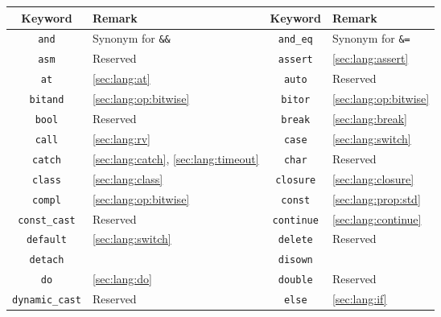 \ifx\ifHtml\undefined
\begin{tabular}{|c|l||c|l|}
  \hline
  Keyword & Remark & Keyword & Remark \\
  \hline
     \lstinline"and" & Synonym for \lstinline|&&|               &
  \lstinline"and_eq" & Synonym for \lstinline|&=|               \\
     \lstinline"asm" & Reserved                                 &
  \lstinline"assert" & \autoref{sec:lang:assert}                \\
      \lstinline"at" & \autoref{sec:lang:at}                    &
    \lstinline"auto" & Reserved                                 \\
  \lstinline"bitand" & \autoref{sec:lang:op:bitwise}            &
   \lstinline"bitor" & \autoref{sec:lang:op:bitwise}            \\
    \lstinline"bool" & Reserved                                 &
   \lstinline"break" & \autoref{sec:lang:break}                 \\
    \lstinline"call" & \autoref{sec:lang:rv}                    &
    \lstinline"case" & \autoref{sec:lang:switch}                \\
   \lstinline"catch" & \autoref{sec:lang:catch}, \autoref{sec:lang:timeout} &
    \lstinline"char" & Reserved                                 \\
   \lstinline"class" & \autoref{sec:lang:class}                 &
 \lstinline"closure" & \autoref{sec:lang:closure}               \\
   \lstinline"compl" & \autoref{sec:lang:op:bitwise}            &
   \lstinline"const" & \autoref{sec:lang:prop:std}              \\
\lstinline"const_cast" & Reserved                                 &
\lstinline"continue" & \autoref{sec:lang:continue}              \\
 \lstinline"default" & \autoref{sec:lang:switch}                &
  \lstinline"delete" & Reserved                                 \\
  \lstinline"detach" &                                          &
  \lstinline"disown" &                                          \\
      \lstinline"do" & \autoref{sec:lang:do}                    &
  \lstinline"double" & Reserved                                 \\
\lstinline"dynamic_cast" & Reserved                                 &
    \lstinline"else" & \autoref{sec:lang:if}                    \\

\end{tabular}
